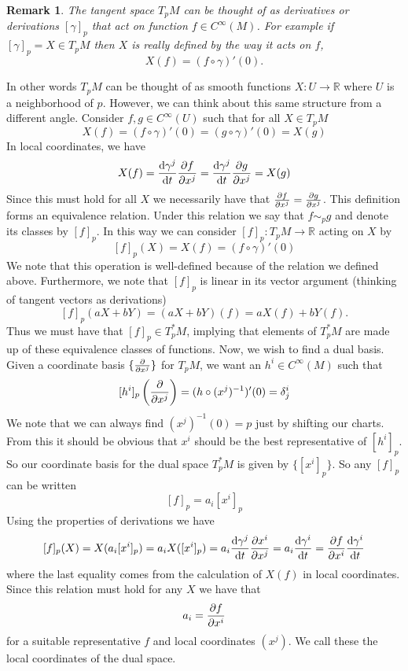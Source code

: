 \documentclass[a4paper]{article}
\newtheorem*{rem}{Remark}
\begin{document}
\begin{rem}
  The tangent space $T_pM$ can be thought of as derivatives or derivations $[\gamma]_p$ that act on function $f \in C^{\infty}(M)$. For example if $[\gamma]_p = X \in T_pM$ then $X$ is really defined by the way it acts on $f$, 
  \[
    X(f) = (f \circ \gamma)'(0).
  \]
\end{rem}
In other words $T_pM$ can be thought of as smooth functions $X: U \rightarrow \mathds{R}$ where $U$ is a neighborhood of $p$. However, we can think about this same structure from a different angle. Consider $f,g \in C^{\infty}(U)$ such that for all $X \in T_pM$
  \[
    X(f) = (f \circ \gamma)'(0) = (g \circ \gamma)'(0) = X(g)
  \]
  In local coordinates, we have
  \[
    X(f) = \dv{\gamma^j}{t} \pdv{f}{x^j} = \dv{\gamma^j}{t} \pdv{g}{x^j} = X(g)
  \]
  Since this must hold for all $X$ we necessarily have that $\pdv{f}{x^j} = \pdv{g}{x^j}$. This definition forms an equivalence relation. Under this relation we say that $f \sim_p g$ and denote its classes by $[f]_p$. In this way we can consider $[f]_p: T_pM \rightarrow \mathds{R}$ acting on $X$ by
  \[
    [f]_p(X) = X(f) = (f \circ \gamma)'(0)
  \]
  We note that this operation is well-defined because of the relation we defined above. Furthermore, we note that $[f]_p$ is linear in its vector argument (thinking of tangent vectors as derivations)
  \[
    [f]_p(a X + bY) = (a X + b Y)(f) = aX(f) + bY(f).
  \]
  Thus we must have that $[f]_p \in T_p^*M$, implying that elements of $T_p^*M$ are made up of these equivalence classes of functions. Now, we wish to find a dual basis. Given a coordinate basis $\{ \pdv{x^j}\}$ for $T_pM$, we want an $h^i \in C^{\infty}(M)$ such that
  \[
    [h^i]_p \left( \pdv{x^j} \right) = (h \circ (x^j)^{-1})'(0) = \delta^i_j
  \]
  We note that we can always find $(x^j)^{-1}(0) = p$ just by shifting our charts. From this it should be obvious that $x^i$ should be the best representative of $[h^i]_p$. So our coordinate basis for the dual space $T_p^*M$ is given by $\{[x^i]_p\}$. So any $[f]_p$ can be written
  \[
    [f]_p = a_i [x^i]_p
  \]
  Using the properties of derivations we have
  \[
    [f]_p(X) = X(a_i[x^i]_p) = a_i X([x^i]_p) = a_i \dv{\gamma^j}{t} \pdv{x^i}{x^j} = a_i \dv{\gamma^i}{t} = \pdv{f}{x^i} \dv{\gamma^i}{t}
  \]
  where the last equality comes from the calculation of $X(f)$ in local coordinates. Since this relation must hold for any $X$ we have that
  \[
    a_i = \pdv{f}{x^i}
  \]
  for a suitable representative $f$ and local coordinates $(x^j)$. We call these the local coordinates of the dual space.
  
\end{document}
